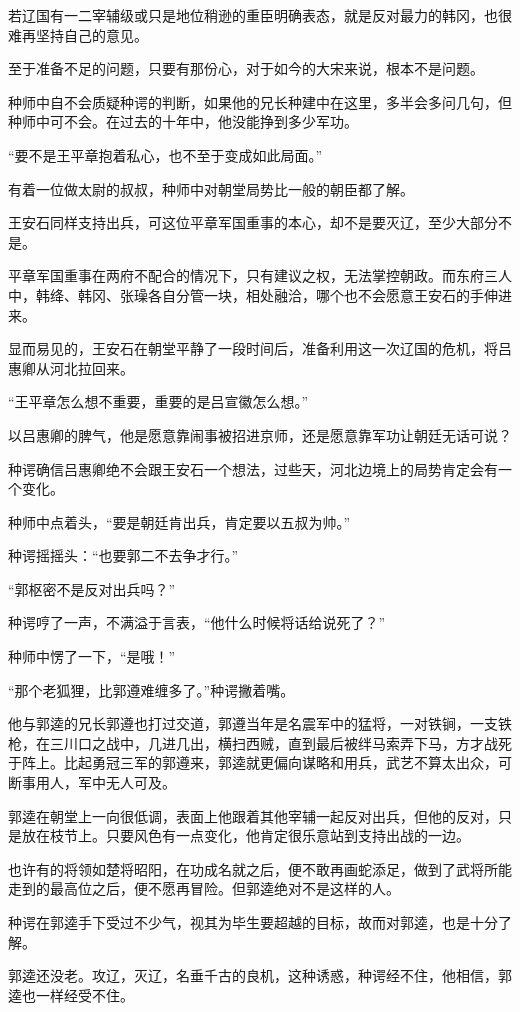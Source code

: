 若辽国有一二宰辅级或只是地位稍逊的重臣明确表态，就是反对最力的韩冈，也很难再坚持自己的意见。

至于准备不足的问题，只要有那份心，对于如今的大宋来说，根本不是问题。

种师中自不会质疑种谔的判断，如果他的兄长种建中在这里，多半会多问几句，但种师中可不会。在过去的十年中，他没能挣到多少军功。

“要不是王平章抱着私心，也不至于变成如此局面。”

有着一位做太尉的叔叔，种师中对朝堂局势比一般的朝臣都了解。

王安石同样支持出兵，可这位平章军国重事的本心，却不是要灭辽，至少大部分不是。

平章军国重事在两府不配合的情况下，只有建议之权，无法掌控朝政。而东府三人中，韩绛、韩冈、张璪各自分管一块，相处融洽，哪个也不会愿意王安石的手伸进来。

显而易见的，王安石在朝堂平静了一段时间后，准备利用这一次辽国的危机，将吕惠卿从河北拉回来。

“王平章怎么想不重要，重要的是吕宣徽怎么想。”

以吕惠卿的脾气，他是愿意靠闹事被招进京师，还是愿意靠军功让朝廷无话可说？

种谔确信吕惠卿绝不会跟王安石一个想法，过些天，河北边境上的局势肯定会有一个变化。

种师中点着头，“要是朝廷肯出兵，肯定要以五叔为帅。”

种谔摇摇头：“也要郭二不去争才行。”

“郭枢密不是反对出兵吗？”

种谔哼了一声，不满溢于言表，“他什么时候将话给说死了？”

种师中愣了一下，“是哦！”

“那个老狐狸，比郭遵难缠多了。”种谔撇着嘴。

他与郭逵的兄长郭遵也打过交道，郭遵当年是名震军中的猛将，一对铁锏，一支铁枪，在三川口之战中，几进几出，横扫西贼，直到最后被绊马索弄下马，方才战死于阵上。比起勇冠三军的郭遵来，郭逵就更偏向谋略和用兵，武艺不算太出众，可断事用人，军中无人可及。

郭逵在朝堂上一向很低调，表面上他跟着其他宰辅一起反对出兵，但他的反对，只是放在枝节上。只要风色有一点变化，他肯定很乐意站到支持出战的一边。

也许有的将领如楚将昭阳，在功成名就之后，便不敢再画蛇添足，做到了武将所能走到的最高位之后，便不愿再冒险。但郭逵绝对不是这样的人。

种谔在郭逵手下受过不少气，视其为毕生要超越的目标，故而对郭逵，也是十分了解。

郭逵还没老。攻辽，灭辽，名垂千古的良机，这种诱惑，种谔经不住，他相信，郭逵也一样经受不住。

